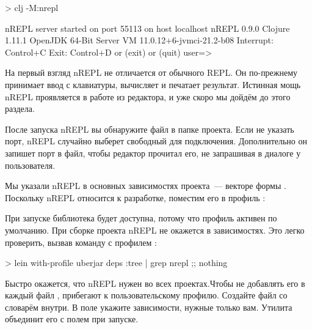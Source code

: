 \begin{english}
  \begin{text}
> clj -M:nrepl

nREPL server started on port 55113 on host localhost
nREPL 0.9.0
Clojure 1.11.1
OpenJDK 64-Bit Server VM 11.0.12+6-jvmci-21.2-b08
Interrupt: Control+C
Exit:      Control+D or (exit) or (quit)
user=>
  \end{text}
\end{english}

На первый взгляд nREPL не отличается от обычного REPL. Он по-прежнему принимает ввод с клавиатуры, вычисляет и печатает результат. Истинная мощь nREPL проявляется в работе из редактора, и уже скоро мы дойдём до этого раздела.

После запуска nREPL вы обнаружите файл  в папке проекта. Если не указать порт, nREPL случайно выберет свободный для подключения. Дополнительно он запишет порт в файл, чтобы редактор прочитал его, не запрашивая в диалоге у пользователя.

Мы указали nREPL в основных зависимостях проекта~--- векторе  формы . Поскольку nREPL относится к разработке, поместим его в профиль :

\begin{english}
  \begin{clojure}
:profiles
{:dev
  {:dependencies
    [[nrepl/nrepl "0.9.0"]]}
  \end{clojure}
\end{english}


При запуске  библиотека будет доступна, потому что профиль  активен по умолчанию. При сборке проекта nREPL не окажется в зависимостях. Это легко проверить, вызвав команду  с профилем :

\begin{english}
  \begin{bash}
> lein with-profile uberjar deps :tree | grep nrepl
;; nothing
  \end{bash}
\end{english}

Быстро окажется, что nREPL нужен во всех проектах.Чтобы не добавлять его в каждый файл , прибегают к пользовательскому профилю. Создайте файл  со словарём внутри. В поле  укажите зависимости, нужные только вам. Утилита  объединит его с полем  при запуске.

